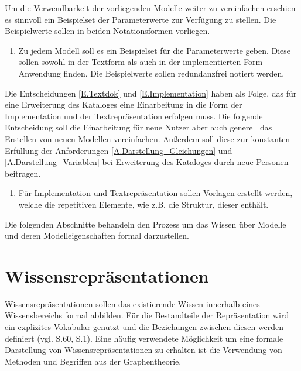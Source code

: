 Um die Verwendbarkeit der vorliegenden Modelle weiter zu vereinfachen erschien es sinnvoll ein Beispielset der Parameterwerte zur Verfügung zu stellen. Die Beispielwerte sollen in beiden Notationsformen vorliegen.
\begin{enumerate}[resume*]
	\item \label{E.Parameterwerte}Zu jedem Modell soll es ein Beispielset für die Parameterwerte geben. Diese sollen sowohl in der Textform als auch in der implementierten Form Anwendung finden. Die Beispielwerte sollen redundanzfrei notiert werden.
\end{enumerate}

Die Entscheidungen \ref{E.Textdok} und \ref{E.Implementation} haben als Folge, das für eine Erweiterung des Kataloges eine Einarbeitung in die Form der Implementation und der Textrepräsentation erfolgen muss. Die folgende Entscheidung soll die Einarbeitung für neue Nutzer aber auch generell das Erstellen von neuen Modellen vereinfachen. Außerdem soll diese zur konstanten Erfüllung der Anforderungen \ref{A.Darstellung_Gleichungen} und \ref{A.Darstellung_Variablen} bei Erweiterung des Kataloges durch neue Personen beitragen.
\begin{enumerate}[resume*]
	\item \label{E.Vorlagen}Für Implementation und Textrepräsentation sollen Vorlagen erstellt werden, welche die repetitiven Elemente, wie z.B. die Struktur, dieser enthält. 
\end{enumerate}

Die folgenden Abschnitte behandeln den Prozess um das Wissen über Modelle und deren Modelleigenschaften formal darzustellen.
\section{Wissensrepräsentationen}
\label{Ch:Vorbetrachtung:Sec:Wissensrepräsentaionen}
Wissensrepräsentationen sollen das existierende Wissen innerhalb eines Wissensbereichs formal abbilden. Für die Bestandteile der Repräsentation wird ein explizites Vokabular genutzt und die Beziehungen zwischen diesen werden definiert (vgl. \cite{BEN16} S.60, \cite{SEB04} S.1). Eine häufig verwendete Möglichkeit um eine formale Darstellung von Wissensrepräsentationen zu erhalten ist die Verwendung von Methoden und Begriffen aus der Graphentheorie.

